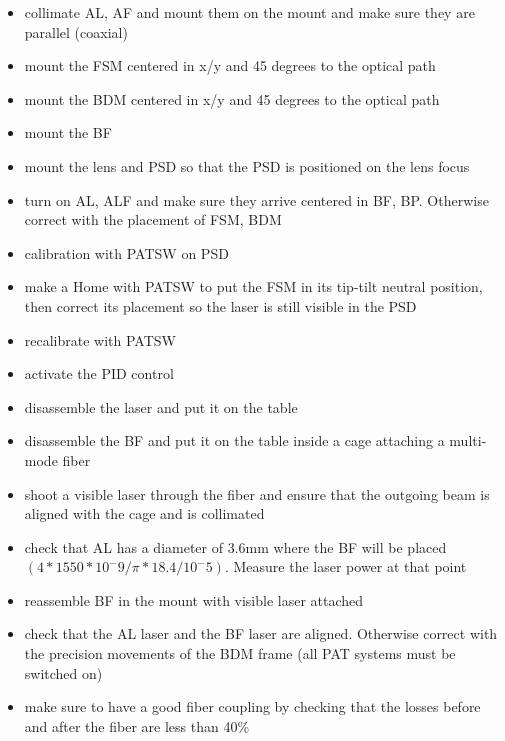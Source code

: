 \begin{itemize}
  \item collimate AL, AF and mount them on the mount and make sure they are parallel (coaxial)
  \item mount the FSM centered in x/y and 45 degrees to the optical path
  \item mount the BDM centered in x/y and 45 degrees to the optical path
  \item mount the BF
  \item mount the lens and PSD so that the PSD is positioned on the lens focus
  \item turn on AL, ALF and make sure they arrive centered in BF, BP. Otherwise correct with the placement of FSM, BDM
  \item calibration with PATSW on PSD
  \item make a Home with PATSW to put the FSM in its tip-tilt neutral position, then correct its placement so the laser is still visible in the PSD
  \item recalibrate with PATSW
  \item activate the PID control
\end{itemize}

\begin{itemize}
  \item disassemble the laser and put it on the table
  \item disassemble the BF and put it on the table inside a cage attaching a multi-mode fiber
  \item shoot a visible laser through the fiber and ensure that the outgoing beam is aligned with the cage and is collimated
  \item check that AL has a diameter of 3.6mm where the BF will be placed $(4 * 1550 * 10^-9 / \pi * 18.4 / 10^-5)$. Measure the laser power at that point
  \item reassemble BF in the mount with visible laser attached
  \item check that the AL laser and the BF laser are aligned. Otherwise correct with the precision movements of the BDM frame (all PAT systems must be switched on)
  \item make sure to have a good fiber coupling by checking that the losses before and after the fiber are less than 40\%
\end{itemize}

